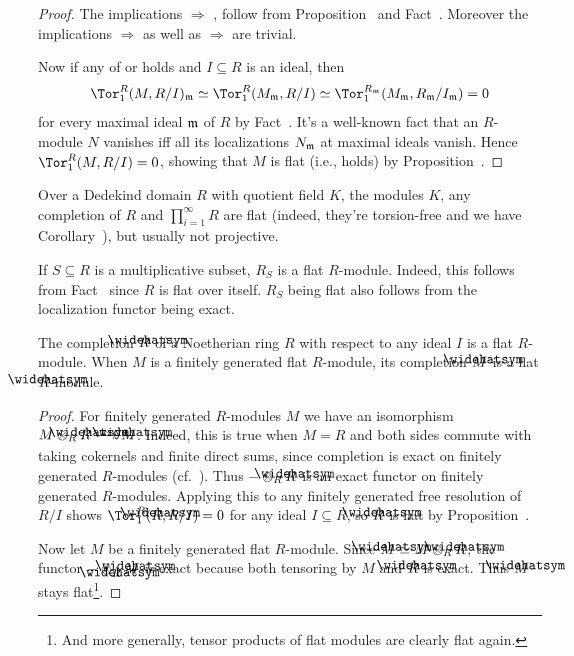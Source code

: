 \documentclass[a4paper,parskip=half,numbers=enddot, DIV=12]{scrreprt}
\begin{document}
\begin{proof}
	The implications  $\Rightarrow$ ,  follow from Proposition~ and Fact~. Moreover the implications  $\Rightarrow$  as well as  $\Rightarrow$  are trivial.
	
	Now if any of  or  holds and $I\subseteq R$ is an ideal, then
	\begin{align*}
		\Tor_1^R(M,R/I)_\mm\simeq \Tor_1^R(M_\mm,R/I)\simeq \Tor_1^{R_\mm}(M_\mm,R_\mm/I_\mm)=0
	\end{align*}
	for every maximal ideal $\mathfrak{m}$ of $R$ by Fact~. It's a well-known fact that an $R$-module $N$ vanishes iff all its localizations $N_{\mathfrak{m}}$ at maximal ideals vanish. Hence $\Tor_1^R(M,R/I)=0$, showing that $M$ is flat (i.e.,  holds) by Proposition~.
\end{proof}
\begin{example}
	Over a Dedekind domain $R$ with quotient field $K$, the modules $K$, any completion of $R$ and $\prod_{i=1}^{\infty}R$ are flat (indeed, they're torsion-free and we have Corollary~), but usually not projective.
\end{example}
\begin{example}
	If $S\subseteq R$ is a multiplicative subset, $R_S$ is a flat $R$-module. Indeed, this follows from Fact~ since $R$ is flat over itself. $R_S$ being flat also follows from the localization functor being exact.
\end{example}
\begin{example}
	The completion $\roof{R}$ of a Noetherian ring $R$ with respect to any ideal $I$ is a flat $R$-module. When $M$ is a finitely generated flat $R$-module, its completion $\roof{M}$ is a flat $\roof{R}$-module.
\end{example}
\begin{proof}
	For finitely generated $R$-modules $M$ we have an isomorphism $M\otimes_R\roof{R}\isomorphism \roof{M}$. Indeed, this is true when $M=R$ and both sides commute with taking cokernels and finite direct sums, since completion is exact on finitely generated $R$-modules (cf.\ \cite[Lemma~7.15]{eisenbudCommAlg}). Thus $-\otimes_R\roof{R}$ is an exact functor on finitely generated $R$-modules. Applying this to any finitely generated free resolution of $R/I$ shows $\Tor_1^R(\roof{R},R/I)=0$ for any ideal $I\subseteq R$, so $\roof{R}$ is flat by Proposition~.
	
	Now let $M$ be a finitely generated flat $R$-module. Since $\roof{M}\simeq M\otimes_R\roof{R}$, the functor $-\otimes_{\roof{R}}\roof{M}$ is exact because both tensoring by $M$ and $\roof{R}$ is exact. Thus $\roof{M}$ stays flat\footnote{And more generally, tensor products of flat modules are clearly flat again.}.
\end{proof}
\end{document}

